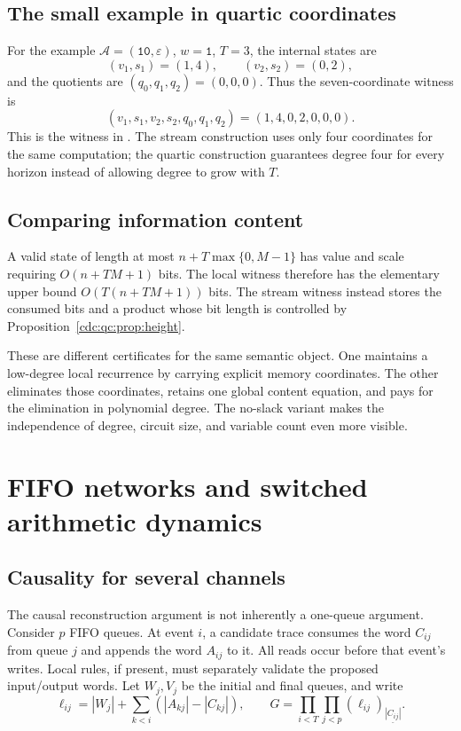 \documentclass[11pt,a4paper]{article}
\theoremstyle{definition}
\theoremstyle{remark}
\newcommand{\eps}{\varepsilon}
\newcommand{\ff}[2]{(#1)_{\underline{#2}}}
\newcommand{\CT}{\mathcal A}
\newcommand{\word}[1]{\mathtt{#1}}
\newcommand{\srctag}[1]{\texorpdfstring{\hspace{0.5em}{\normalfont\small\color{accent}[#1]}}{ [#1]}}
\begin{document}
\subsection{The small example in quartic coordinates}
For the example $\CT=(\word{10},\eps)$, $w=\word{1}$, $T=3$, the internal states are
\[
 (v_1,s_1)=(1,4),\qquad (v_2,s_2)=(0,2),
\]
and the quotients are $(q_0,q_1,q_2)=(0,0,0)$. Thus the seven-coordinate witness is
\[
 (v_1,s_1,v_2,s_2,q_0,q_1,q_2)=(1,4,0,2,0,0,0).
\]
This is the witness in . The stream construction uses only four coordinates for the same computation; the quartic construction guarantees degree four for every horizon instead of allowing degree to grow with $T$.

\subsection{Comparing information content}
A valid state of length at most $n+T\max\{0,M-1\}$ has value and scale requiring $O(n+TM+1)$ bits. The local witness therefore has the elementary upper bound $O(T(n+TM+1))$ bits. The stream witness instead stores the consumed bits and a product whose bit length is controlled by Proposition~\ref{cdc:qc:prop:height}.

These are different certificates for the same semantic object. One maintains a low-degree local recurrence by carrying explicit memory coordinates. The other eliminates those coordinates, retains one global content equation, and pays for the elimination in polynomial degree. The no-slack variant makes the independence of degree, circuit size, and variable count even more visible.

\section{FIFO networks and switched arithmetic dynamics\srctag{07}}\label{cdc:qc:sec:substrates}
\subsection{Causality for several channels}
The causal reconstruction argument is not inherently a one-queue argument. Consider $p$ FIFO queues. At event $i$, a candidate trace consumes the word $C_{ij}$ from queue $j$ and appends the word $A_{ij}$ to it. All reads occur before that event's writes. Local rules, if present, must separately validate the proposed input/output words. Let $W_j,V_j$ be the initial and final queues, and write
\[
 \ell_{ij}=|W_j|+\sum_{k<i}(|A_{kj}|-|C_{kj}|),\qquad
 G=\prod_{i<T}\prod_{j<p}\ff{\ell_{ij}}{|C_{ij}|}.
\]
\end{document}
